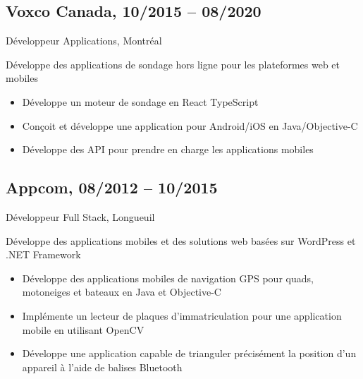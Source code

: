 \documentclass{article}
\begin{document}
\begin{paracol}{2}
\begin{rightcolumn}
    \subsection{Voxco Canada, 10/2015 -- 08/2020}  
    {Développeur Applications, Montréal\par}  
    {  
      Développe des applications de sondage hors ligne pour les plateformes web et mobiles  
    \par}  
    \begin{itemize}  
      \item Développe un moteur de sondage en React TypeScript  
      \item Conçoit et développe une application pour Android/iOS en Java/Objective-C  
      \item Développe des API pour prendre en charge les applications mobiles  
    \end{itemize}  

    \vspace{1em}  

    \subsection{Appcom, 08/2012 -- 10/2015}  
    {Développeur Full Stack, Longueuil\par}  
    {  
      Développe des applications mobiles et des solutions web basées sur WordPress et .NET Framework
    \par}  
    \begin{itemize}  
      \item Développe des applications mobiles de navigation GPS pour quads, motoneiges et bateaux en Java et Objective-C  
      \item Implémente un lecteur de plaques d’immatriculation pour une application mobile en utilisant OpenCV  
      \item Développe une application capable de trianguler précisément la position d’un appareil à l’aide de balises Bluetooth  
    \end{itemize}  

    \vspace{1em}  


\end{rightcolumn}
\end{paracol}
\end{document}
